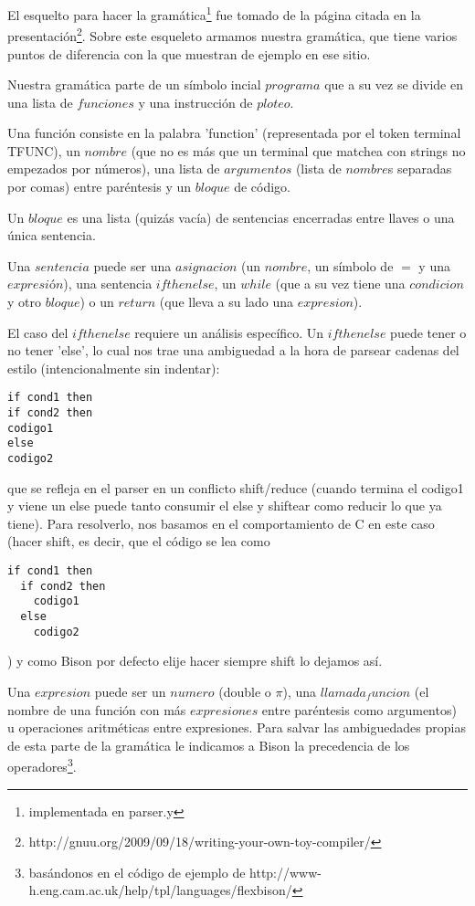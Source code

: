 El esquelto para hacer la gramática\footnote{implementada en parser.y} fue tomado de la página citada en la presentación\footnote{http://gnuu.org/2009/09/18/writing-your-own-toy-compiler/}. Sobre este esqueleto armamos nuestra gramática, que tiene varios puntos de diferencia con la que muestran de ejemplo en ese sitio.

Nuestra gramática parte de un símbolo incial $programa$ que a su vez se divide en una lista de $funciones$ y una instrucción de $ploteo$.

Una función consiste en la palabra 'function' (representada por el token terminal TFUNC), un $nombre$ (que no es más que un terminal que matchea con strings no empezados por números), una lista de $argumentos$ (lista de $nombre$s separadas por comas) entre paréntesis y un $bloque$ de código.

Un $bloque$ es una lista (quizás vacía) de sentencias encerradas entre llaves o una única sentencia.

Una $sentencia$ puede ser una $asignacion$ (un $nombre$, un símbolo de $=$ y una $expresión$), una sentencia $ifthenelse$, un $while$ (que a su vez tiene una $condicion$ y otro $bloque$) o un $return$ (que lleva a su lado una $expresion$).

El caso del $ifthenelse$ requiere un análisis específico. Un $ifthenelse$ puede tener o no tener 'else', lo cual nos trae una ambiguedad a la hora de parsear cadenas del estilo (intencionalmente sin indentar):
\begin{verbatim}
if cond1 then
if cond2 then
codigo1
else
codigo2
\end{verbatim}
que se refleja en el parser en un conflicto shift/reduce (cuando termina el codigo1 y viene un else puede tanto consumir el else y shiftear como reducir lo que ya tiene).
Para resolverlo, nos basamos en el comportamiento de C en este caso (hacer shift, es decir, que el código se lea como
\begin{verbatim}
if cond1 then
  if cond2 then
    codigo1
  else
    codigo2
\end{verbatim}
) y como Bison por defecto elije hacer siempre shift lo dejamos así.

Una $expresion$ puede ser un $numero$ (double o $\pi$), una $llamada_funcion$ (el nombre de una función con más $expresiones$ entre paréntesis como argumentos) u operaciones aritméticas entre expresiones. Para salvar las ambiguedades propias de esta parte de la gramática le indicamos a Bison la precedencia de los operadores\footnote{basándonos en el código de ejemplo de http://www-h.eng.cam.ac.uk/help/tpl/languages/flexbison/}.

